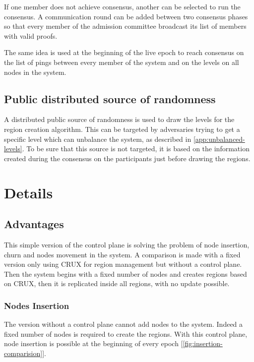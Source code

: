 \documentclass[a4paper,11pt,twoside,openright]{report}
\begin{document}
If one member does not achieve consensus, another can be selected to
run the consensus. A communication round can be added between two consensus
phases so that every member of the admission committee broadcast its list
of members with valid proofs.

The same idea is used at the beginning of the live epoch to reach consensus on
the list of pings between every member of the system and on the levels on all
nodes in the system.

\subsection{Public distributed source of randomness}
A distributed public
source of randomness is used to draw the levels for the region creation algorithm. This can be targeted by adversaries trying
to get a specific level which can unbalance the system, as described in
\autoref{app:unbalanced-levels}. To be sure that this source is not targeted,
it is based on the information created during the consensus on the participants
just before drawing the regions. 

\FloatBarrier
\section{Details}
\subsection{Advantages}
This simple version of the control plane is solving the problem of node
insertion, churn and nodes movement in the system. A comparison is made
with a fixed version only using CRUX for region management but without a
control plane. Then the system begins with a fixed number of nodes and creates
regions based on CRUX, then it is replicated inside all regions, with
no update possible.

\subsubsection{Nodes Insertion}
The version without a control plane cannot add nodes to the system. Indeed a
fixed number of nodes is required to create the regions. With this control
plane, node insertion is possible at the beginning of every epoch
[\autoref{fig:insertion-comparision}].
\end{document}

